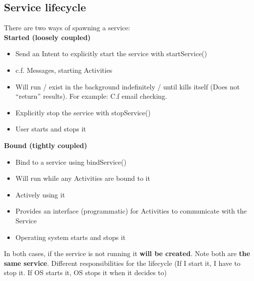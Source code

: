 \documentclass{article}
\begin{document}
\subsection{Service lifecycle}
There are two ways of spawning a service:\\
\textbf{Started	(loosely	coupled)}
\begin{itemize}
  \item Send an Intent to explicitly start the service with startService()
  \item c.f. Messages, starting Activities
  \item Will run / exist in the background indefinitely / until kills itself (Does not “return” results). For example: C.f email checking.
  \item Explicitly stop the service with stopService()
  \item User starts and stops it
\end{itemize}
\textbf{Bound	(tightly	coupled)}
\begin{itemize}
  \item Bind to a service using bindService()
  \item Will run while any Activities are bound to it
  \item Actively using it
  \item Provides an interface (programmatic) for Activities to communicate with the Service
  \item Operating system starts and stops it
\end{itemize}

\begin{flushleft}
In both cases, if the service is not running it \textbf{will be created}. Note both are \textbf{the same service}. Different responsibilities for the lifecycle (If I start it, I have to stop it. If OS starts it, OS stops it when it decides to)
\end{flushleft}
\end{document}
